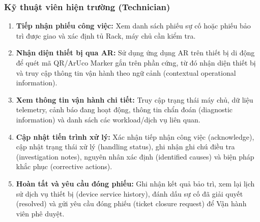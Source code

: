 \subsubsection{Kỹ thuật viên hiện trường (Technician)}
\begin{enumerate}[label=\textbf{FT-\arabic*}., leftmargin=2.5em]
    \item \textbf{Tiếp nhận phiếu công việc:} Xem danh sách phiếu sự cố hoặc phiếu bảo trì được giao và xác định tủ Rack, máy chủ cần kiểm tra.
    \item \textbf{Nhận diện thiết bị qua AR:} Sử dụng ứng dụng AR trên thiết bị di động để quét mã QR/ArUco Marker gắn trên phần cứng, từ đó nhận diện thiết bị và truy cập thông tin vận hành theo ngữ cảnh (contextual operational information).
    \item \textbf{Xem thông tin vận hành chi tiết:} Truy cập trạng thái máy chủ, dữ liệu telemetry, cảnh báo đang hoạt động, thông tin chẩn đoán (diagnostic information) và danh sách các workload/dịch vụ liên quan.
    \item \textbf{Cập nhật tiến trình xử lý:} Xác nhận tiếp nhận công việc (acknowledge), cập nhật trạng thái xử lý (handling status), ghi nhận ghi chú điều tra (investigation notes), nguyên nhân xác định (identified causes) và biện pháp khắc phục (corrective actions).
    \item \textbf{Hoàn tất và yêu cầu đóng phiếu:} Ghi nhận kết quả bảo trì, xem lại lịch sử dịch vụ thiết bị (device service history), đánh dấu sự cố đã giải quyết (resolved) và gửi yêu cầu đóng phiếu (ticket closure request) để Vận hành viên phê duyệt.
\end{enumerate}


